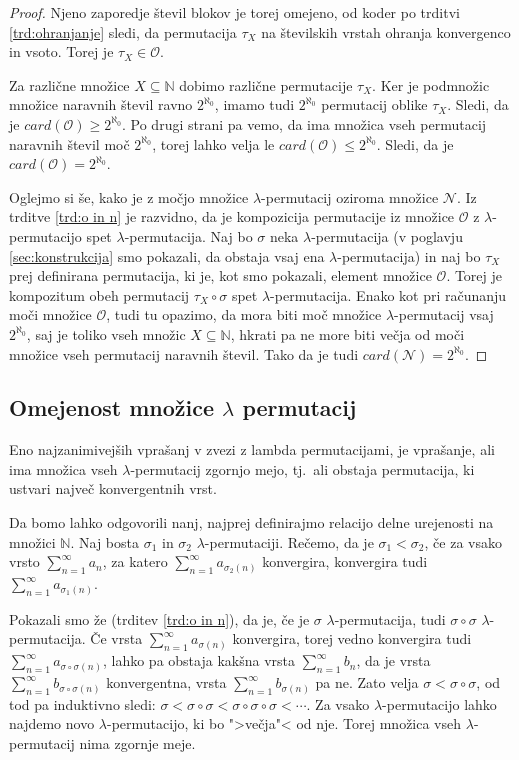 \documentclass[12pt,a4paper,reqno]{amsart}
\theoremstyle{definition} %
\theoremstyle{plain} %
\newcommand{\N}{\mathbb N}
\begin{document}
\begin{proof}
Njeno zaporedje števil blokov je torej omejeno, od koder po trditvi \ref{trd:ohranjanje} sledi, da permutacija $\tau_X$ na številskih vrstah ohranja konvergenco in vsoto. Torej je $\tau_X \in \mathcal{O}$.

Za različne množice $X \subseteq \N$ dobimo različne permutacije $\tau_X$. Ker je podmnožic množice naravnih števil ravno $2^{\aleph_0}$, imamo tudi $2^{\aleph_0}$ permutacij oblike $\tau_X$. Sledi, da je $card(\mathcal{O})\geq2^{\aleph_0}$. Po drugi strani pa vemo, da ima množica vseh permutacij naravnih števil moč $2^{\aleph_0}$, torej lahko velja le $card(\mathcal{O})\leq2^{\aleph_0}$. Sledi, da je $card(\mathcal{O})=2^{\aleph_0}$.

Oglejmo si še, kako je z močjo množice $\lambda$-permutacij oziroma množice $\mathcal{N}$. Iz trditve \ref{trd:o in n} je razvidno, da je kompozicija permutacije iz množice $\mathcal{O}$ z $\lambda$-permutacijo spet $\lambda$-permutacija. Naj bo $\sigma$ neka $\lambda$-permutacija (v poglavju \ref{sec:konstrukcija} smo pokazali, da obstaja vsaj ena $\lambda$-permutacija) in naj bo $\tau_X$ prej definirana permutacija, ki je, kot smo pokazali, element množice $\mathcal{O}$. Torej je kompozitum obeh permutacij $\tau_X \circ \sigma$ spet $\lambda$-permutacija. Enako kot pri računanju moči množice $\mathcal{O}$, tudi tu opazimo, da mora biti moč množice $\lambda$-permutacij vsaj $2^{\aleph_0}$, saj je toliko vseh množic $X \subseteq \N$, hkrati pa ne more biti večja od moči množice vseh permutacij naravnih števil. Tako da je tudi  $card(\mathcal{N})=2^{\aleph_0}$.
\end{proof}

\subsection{Omejenost množice $\lambda$ permutacij}

Eno najzanimivejših vprašanj v zvezi z lambda permutacijami, je vprašanje, ali ima množica vseh $\lambda$-permutacij zgornjo mejo, tj.\ ali obstaja permutacija, ki ustvari največ konvergentnih vrst.

Da bomo lahko odgovorili nanj, najprej definirajmo relacijo delne urejenosti na množici $ \mathbb{N}$. Naj bosta $\sigma _1$ in $\sigma _2$ $\lambda$-permutaciji. Rečemo, da je $\sigma_1 < \sigma_2$, če za vsako vrsto $\sum^{\infty}_{n=1}a_n$, za katero $\sum^{\infty}_{n=1}a_{\sigma_2(n)}$ konvergira, konvergira tudi $\sum^{\infty}_{n=1}a_{\sigma_1(n)}$. 

Pokazali smo že (trditev \ref{trd:o in n}), da je, če je $\sigma$ $\lambda$-permutacija, tudi $\sigma \circ \sigma$  $\lambda$-permutacija. Če vrsta $\sum^{\infty}_{n=1}a_{\sigma(n)}$ konvergira, torej vedno konvergira tudi $\sum^{\infty}_{n=1}a_{\sigma \circ \sigma(n)}$, lahko pa obstaja kakšna vrsta $\sum^{\infty}_{n=1}b_n$, da je vrsta $\sum^{\infty}_{n=1}b_{\sigma \circ \sigma(n)}$ konvergentna, vrsta $\sum^{\infty}_{n=1}b_{\sigma(n)}$ pa ne. Zato velja $\sigma < \sigma \circ \sigma$, od tod pa induktivno sledi: $\sigma < \sigma \circ \sigma < \sigma \circ \sigma \circ \sigma < \cdots$. Za vsako $\lambda$-permutacijo lahko najdemo novo $\lambda$-permutacijo, ki bo ">večja"< od nje. Torej množica vseh $\lambda$-permutacij nima zgornje meje. 
\end{document}

